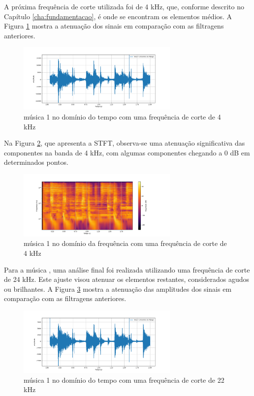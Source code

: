A próxima frequência de corte utilizada foi de 4 kHz, que, conforme descrito no Capítulo \ref{cha:fundamentacao}, é onde se encontram os elementos médios. A Figura \ref{fig26} mostra a atenuação dos sinais em comparação com as filtragens anteriores.

\begin{figure}[h]
    \centering
    \includegraphics[width=0.7\textwidth]{figuras/fig26.png}
    \caption{música 1 no domínio do tempo com uma frequência de corte de 4 kHz}
    \label{fig26}
\end{figure}

Na Figura \ref{fig27}, que apresenta a STFT, observa-se uma atenuação significativa das componentes na banda de 4 kHz, com algumas componentes chegando a 0 dB em determinados pontos.

\begin{figure}[h]
    \centering
    \includegraphics[width=0.7\textwidth]{figuras/fig27.png}
    \caption{música 1 no domínio da frequência com uma frequência de corte de 4 kHz}
    \label{fig27}
\end{figure}

Para a música \cite{track01}, uma análise final foi realizada utilizando uma frequência de corte de 24 kHz. Este ajuste visou atenuar os elementos restantes, considerados agudos ou brilhantes. A Figura \ref{fig30} mostra a atenuação das amplitudes dos sinais em comparação com as filtragens anteriores.

\begin{figure}[h]
    \centering
    \includegraphics[width=0.7\textwidth]{figuras/fig30.png}
    \caption{música 1 no domínio do tempo com uma frequência de corte de 22 kHz}
    \label{fig30}
\end{figure}

